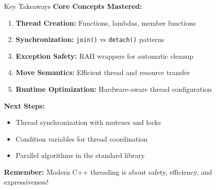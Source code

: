 \begin{frame}[fragile]{ Key Takeaways}
	\textbf{Core Concepts Mastered:}
	\begin{enumerate}
		\item \textbf{Thread Creation:} Functions, lambdas, member functions
		\item \textbf{Synchronization:} \texttt{join()} vs \texttt{detach()} patterns
		\item \textbf{Exception Safety:} RAII wrappers for automatic cleanup
		\item \textbf{Move Semantics:} Efficient thread and resource transfer
		\item \textbf{Runtime Optimization:} Hardware-aware thread configuration
	\end{enumerate}

	\vspace{1em}
	\textbf{Next Steps:}
	\begin{itemize}
		\item Thread synchronization with mutexes and locks
		\item Condition variables for thread coordination
		\item Parallel algorithms in the standard library
	\end{itemize}

	\vspace{1em}
	\textbf{Remember:} Modern C++ threading is about safety, efficiency, and expressiveness!
\end{frame}
